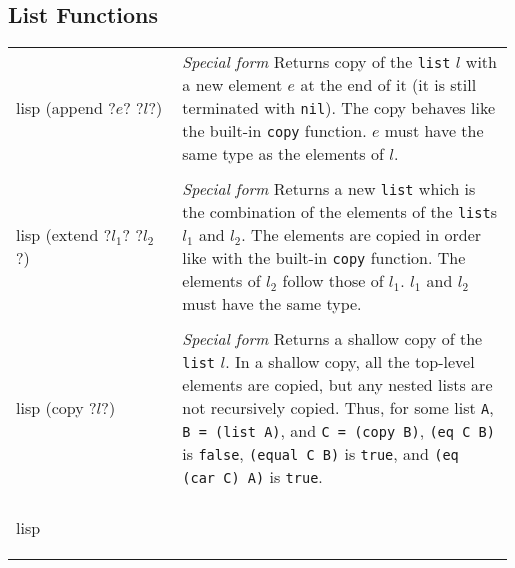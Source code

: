 \documentclass[a4paper, 12pt]{article}
\makeatletter
\newenvironment{funcdefs}
    {\begin{longtable}{@{} x{0.33\linewidth} @{} >{\raggedright\arraybackslash}p{0.66\linewidth} @{}}}
    {\end{longtable}}
\def\specialf/{\textit{Special form}\hspace{0.5em}}
\makeatother
\begin{document}
\subsection{List Functions}
\begin{funcdefs}
    \begin{minipage}[t]{\linewidth}
        \centering
        \begin{cminted}[autogobble=true, escapeinside=??]{lisp}
            (append ?$e$? ?$l$?)
        \end{cminted}
    \end{minipage}
    & \specialf/ Returns copy of the \texttt{list} $l$ with a new element $e$ at the end of it (it is still terminated with \texttt{nil}). The copy behaves like the built-in \texttt{copy} function. $e$ must have the same type as the elements of $l$.
    \\ \\
    \begin{minipage}[t]{\linewidth}
        \centering
        \begin{cminted}[autogobble=true, escapeinside=??]{lisp}
            (extend ?$l_1$? ?$l_2$?)
        \end{cminted}
    \end{minipage}
    & \specialf/ Returns a new \texttt{list} which is the combination of the elements of the \texttt{list}s $l_1$ and $l_2$. The elements are copied in order like with the built-in \texttt{copy} function. The elements of $l_2$ follow those of $l_1$. $l_1$ and $l_2$ must have the same type.
    \\ \\
    \begin{minipage}[t]{\linewidth}
        \centering
        \begin{cminted}[autogobble=true, escapeinside=??]{lisp}
            (copy ?$l$?)
        \end{cminted}
    \end{minipage}
    & \specialf/ Returns a shallow copy of the \texttt{list} $l$. In a shallow copy, all the top-level elements are copied, but any nested lists are not recursively copied. Thus, for some list \texttt{A}, \texttt{B = (list A)}, and \texttt{C = (copy B)}, \texttt{(eq C B)} is \texttt{false}, \texttt{(equal C B)} is \texttt{true}, and \texttt{(eq (car C) A)} is \texttt{true}.
    \\ \\
    \begin{minipage}[t]{\linewidth}
        \centering
        \begin{cminted}[autogobble=true, escapeinside=??]{lisp}

\end{cminted}
\end{minipage}
\end{funcdefs}
\end{document}
